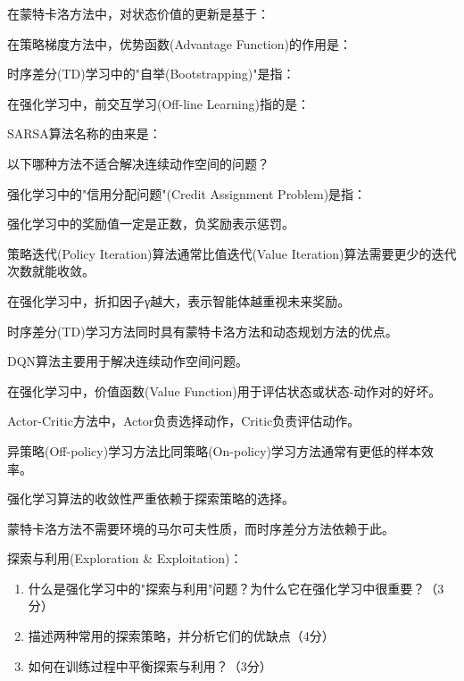 \documentclass[zihao=5,noanswers]{BHCexam}
\begin{document}
\begin{questions}
\question 在蒙特卡洛方法中，对状态价值的更新是基于：

\question 在策略梯度方法中，优势函数(Advantage Function)的作用是：

\question 时序差分(TD)学习中的"自举(Bootstrapping)"是指：

\question 在强化学习中，前交互学习(Off-line Learning)指的是：

\question SARSA算法名称的由来是：

\question 以下哪种方法不适合解决连续动作空间的问题？

\question 强化学习中的"信用分配问题"(Credit Assignment Problem)是指：

\panduan

\question 强化学习中的奖励值一定是正数，负奖励表示惩罚。

\question 策略迭代(Policy Iteration)算法通常比值迭代(Value Iteration)算法需要更少的迭代次数就能收敛。

\question 在强化学习中，折扣因子γ越大，表示智能体越重视未来奖励。

\question 时序差分(TD)学习方法同时具有蒙特卡洛方法和动态规划方法的优点。

\question DQN算法主要用于解决连续动作空间问题。

\question 在强化学习中，价值函数(Value Function)用于评估状态或状态-动作对的好坏。

\question Actor-Critic方法中，Actor负责选择动作，Critic负责评估动作。

\question 异策略(Off-policy)学习方法比同策略(On-policy)学习方法通常有更低的样本效率。

\question 强化学习算法的收敛性严重依赖于探索策略的选择。

\question 蒙特卡洛方法不需要环境的马尔可夫性质，而时序差分方法依赖于此。

\jianda

\question[10] 探索与利用(Exploration & Exploitation)：
\begin{enumerate}
    \item 什么是强化学习中的"探索与利用"问题？为什么它在强化学习中很重要？（3分）
    \item 描述两种常用的探索策略，并分析它们的优缺点（4分）
    \item 如何在训练过程中平衡探索与利用？（3分）
\end{enumerate}


\end{questions}
\end{document}
